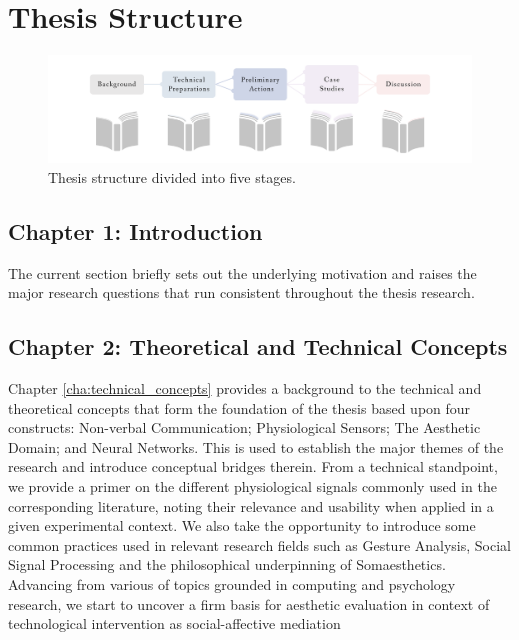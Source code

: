 \section{Thesis Structure}
\label{sec:structure}

\begin{figure}[htbp]
	\centering
	\includegraphics[width=1.0\textwidth]{Chapters/Figures/background/Sec1_Thesis_Structure}
	\caption{Thesis structure divided into five stages.}
	\label{fig:thesis_structure}
\vspace*{-20pt}
\end{figure}

\subsection{Chapter 1: Introduction}
The current section briefly sets out the underlying motivation and raises the major research questions that run consistent throughout the thesis research.

\subsection{Chapter 2: Theoretical and Technical Concepts}

Chapter \ref{cha:technical_concepts} provides a background to the technical and theoretical concepts that form the foundation of the thesis based upon four constructs: Non-verbal Communication; Physiological Sensors; The Aesthetic Domain; and Neural Networks. This is used to establish the major themes of the research and introduce conceptual bridges therein. From a technical standpoint, we provide a primer on the different physiological signals commonly used in the corresponding literature, noting their relevance and usability when applied in a given experimental context. We also take the opportunity to introduce some common practices used in relevant research fields such as Gesture Analysis, Social Signal Processing and the philosophical underpinning of Somaesthetics. Advancing from various of topics grounded in computing and psychology research, we start to uncover a firm basis for aesthetic evaluation in context of technological intervention as social-affective mediation

